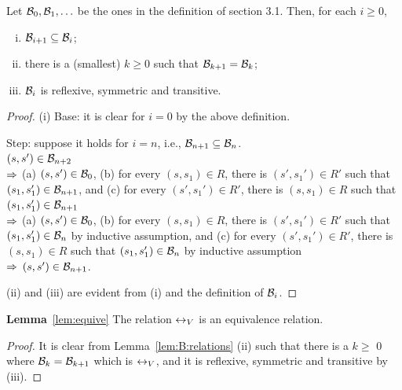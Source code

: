 \documentclass{article}
\begin{document}
\begin{lemma}\label{lem:B:relations}
  Let  ${\cal B}_0, {\cal B}_1,\ldots$ be the ones in the definition of section 3.1.
   Then,  for each $i\ge 0$,
   \begin{enumerate}[(i)]
     \item ${\cal B}_{i+1}\subseteq {\cal B}_i$;
     \item there is a (smallest) $k\ge 0$ such that ${\cal B}_{k+1}={\cal B}_k$;
     \item ${\cal B}_i$ is reflexive, symmetric and transitive.
   \end{enumerate}
\end{lemma}
\begin{proof}
  (i)
  Base: it is clear for $i=0$ by the above definition.

  Step: suppose it holds for $i=n$, i.e., ${\cal B}_{n+1}\subseteq{\cal B}_n$. \\
  $(s,s')\in{\cal B}_{n+2}$\\
  $\Rightarrow$ (a) $(s,s')\in  {\cal B}_0$,
    (b) for every $(s,s_1)\in R$, there is $(s',s_1')\in R'$
     such that $(s_1,s_1')\in {\cal B}_{n+1}$, and
    (c)  for every $(s',s_1')\in R'$, there is $(s,s_1)\in R$
    such that $(s_1,s_1')\in {\cal B}_{n+1}$\\
  $\Rightarrow$ (a) $(s,s')\in  {\cal B}_0$,
   (b) for every $(s,s_1)\in R$, there is $(s',s_1')\in R'$
     such that $(s_1,s_1')\in {\cal B}_{n}$ by inductive assumption, and
   (c)  for every $(s',s_1')\in R'$, there is $(s,s_1)\in R$
    such that $(s_1,s_1')\in {\cal B}_{n}$ by inductive assumption\\
  $\Rightarrow$ $(s,s')\in {\cal B}_{n+1}$.

  (ii) and (iii) are evident from (i) and the definition of ${\cal B}_i$.
\end{proof}


\noindent\textbf{Lemma}~\ref{lem:equive}  The relation $\leftrightarrow_V$ is an equivalence relation.\\
\begin{proof}
It is clear from Lemma~\ref{lem:B:relations} (ii) such that there is a $k \geq $ 0 where ${\cal B}_k = {\cal B}_{k+1}$ which is  $\leftrightarrow_V$, and it is reflexive, symmetric and transitive by (iii).
\end{proof}
\end{document}
